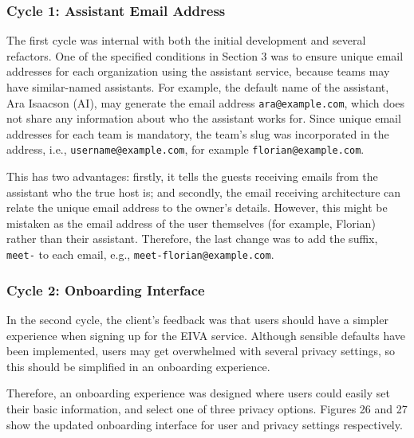 \documentclass{article}
\begin{document}
\subsubsection{Cycle 1: Assistant Email Address}

The first cycle was internal with both the initial development and several refactors. One of the specified conditions in Section 3 was to ensure unique email addresses for each organization using the assistant service, because teams may have similar-named assistants. For example, the default name of the assistant, Ara Isaacson (AI), may generate the email address \texttt{ara@example.com}, which does not share any information about who the assistant works for. Since unique email addresses for each team is mandatory, the team's slug was incorporated in the address, i.e., \texttt{username@example.com}, for example \texttt{florian@example.com}. 

This has two advantages: firstly, it tells the guests receiving emails from the assistant who the true host is; and secondly, the email receiving architecture can relate the unique email address to the owner's details. However, this might be mistaken as the email address of the user themselves (for example, Florian) rather than their assistant. Therefore, the last change was to add the suffix, \texttt{meet-} to each email, e.g., \texttt{meet-florian@example.com}.

\subsubsection{Cycle 2: Onboarding Interface}

In the second cycle, the client's feedback was that users should have a simpler experience when signing up for the EIVA service. Although sensible defaults have been implemented, users may get overwhelmed with several privacy settings, so this should be simplified in an onboarding experience.

Therefore, an onboarding experience was designed where users could easily set their basic information, and select one of three privacy options. Figures 26 and 27 show the updated onboarding interface for user and privacy settings respectively.
\end{document}
